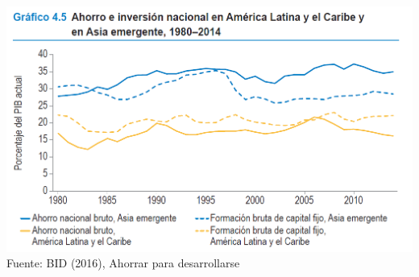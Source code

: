 \documentclass{beamer}
\begin{document}
	\begin{frame}[plain]
		\centering
		\includegraphics[width=.8\linewidth, keepaspectratio]{latam} \\
		{\footnotesize{Fuente: BID (2016), Ahorrar para desarrollarse}}
	\end{frame}
\end{document}
